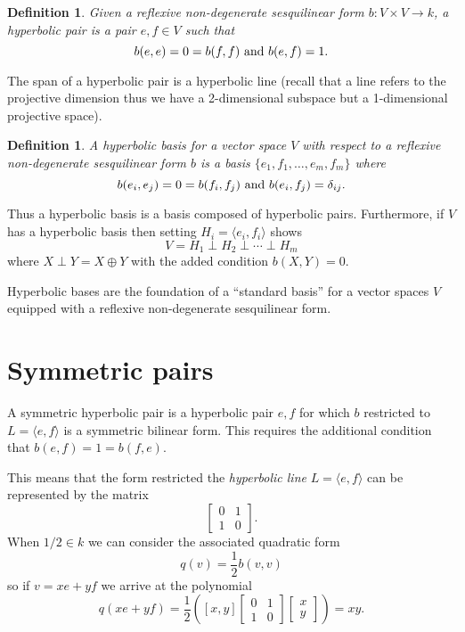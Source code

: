 \documentclass[12pt]{article}
\newtheorem{defn}[thm]{Definition}
\begin{document}
\begin{defn}
Given a reflexive non-degenerate sesquilinear form $b:V\times V\rightarrow k$,
a \emph{hyperbolic pair} is a pair $e,f\in V$ such that 
\[b(e,e)=0=b(f,f)\textnormal{ and } b(e,f)=1.\]
\end{defn}

The span of a hyperbolic pair is a hyperbolic line (recall that a line refers to the projective dimension thus we have a 2-dimensional subspace but a 1-dimensional projective space).

\begin{defn}
A \emph{hyperbolic basis} for a vector space $V$ with respect to a reflexive 
non-degenerate sesquilinear form $b$ is a basis
$\{e_1,f_1,\dots,e_m,f_m\}$ where 
\[b(e_i,e_j)=0=b(f_i,f_j)\textnormal{ and } b(e_i,f_j)=\delta_{ij}.\]
\end{defn}

Thus a hyperbolic basis is a basis composed of hyperbolic pairs.  Furthermore,
if $V$ has a hyperbolic basis then setting $H_i=\langle e_i,f_i\rangle$ shows
\[V=H_1\perp H_2\perp\cdots \perp H_m\]
where $X\perp Y=X\oplus Y$ with the added condition $b(X,Y)=0$.

Hyperbolic bases are the foundation of a ``standard basis'' for a vector spaces $V$ equipped with a reflexive non-degenerate sesquilinear form.

\section{Symmetric pairs}

A symmetric hyperbolic pair is a hyperbolic pair $e,f$ for which $b$ restricted to $L=\langle e,f\rangle$ is a symmetric bilinear form.  This requires the additional condition that $b(e,f)=1=b(f,e)$.

This means that the form restricted the \emph{hyperbolic line} $L=\langle e,f\rangle$ can be represented by the matrix
\[\begin{bmatrix} 0 & 1\\ 1 & 0\end{bmatrix}.\]
When $1/2\in k$ we can consider the associated quadratic form
\[q(v)=\frac{1}{2}b(v,v)\]
so if $v=x e+y f$ we arrive at the polynomial 
\[q(xe+yf)=\frac{1}{2}\left([x, y]\begin{bmatrix} 0 & 1\\ 1 & 0\end{bmatrix}\begin{bmatrix} x\\ y\end{bmatrix}\right)=x y.\]
\end{document}
